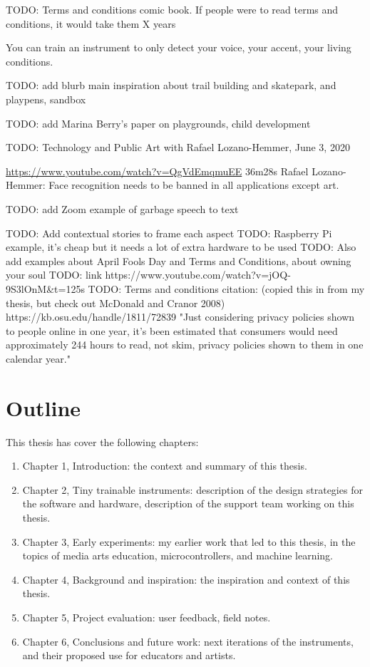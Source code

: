 TODO: Terms and conditions comic book. If people were to read terms and conditions, it would take them X years

You can train an instrument to only detect your voice, your accent, your living conditions.

TODO: add blurb main inspiration about trail building and skatepark, and playpens, sandbox

TODO: add Marina Berry’s paper on playgrounds, child development

TODO: Technology and Public Art with Rafael Lozano-Hemmer, June 3, 2020

\url{https://www.youtube.com/watch?v=QgVdEmqmuEE}
36m28s
Rafael Lozano-Hemmer: Face recognition needs to be banned in all applications except art.

TODO: add Zoom example of garbage speech to text

TODO: Add contextual stories to frame each aspect
TODO: Raspberry Pi example, it’s cheap but it needs a lot of extra hardware to be used
TODO: Also add examples about April Fools Day and Terms and Conditions, about owning your soul
TODO: link https://www.youtube.com/watch?v=jOQ-9S3lOnM\&t=125s
TODO: Terms and conditions citation: (copied this in from my thesis, but check out McDonald and Cranor 2008) https://kb.osu.edu/handle/1811/72839 "Just considering privacy policies shown to people online in one year, it's been estimated that consumers would need approximately 244 hours to read, not skim, privacy policies shown to them in one calendar year."

\section{Outline}

This thesis has cover the following chapters:

\begin{enumerate}
  \item Chapter 1, Introduction: the context and summary of this thesis.
  \item Chapter 2, Tiny trainable instruments: description of the design strategies for the software and hardware, description of the support team working on this thesis.
  \item Chapter 3, Early experiments: my earlier work that led to this thesis, in the topics of media arts education, microcontrollers, and machine learning.
  \item Chapter 4, Background and inspiration: the inspiration and context of this thesis.
  \item Chapter 5, Project evaluation: user feedback, field notes.
  \item Chapter 6, Conclusions and future work: next iterations of the instruments, and their proposed use for educators and artists.
  \end{enumerate}
